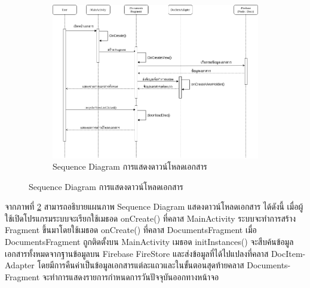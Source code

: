 	\begin{figure}
	\begin{figure}[H]
		\centering
		\includegraphics[width=0.8\columnwidth]
		{Figures/3/Sequence/doc}
		\caption{Sequence Diagram การแสดงดาวน์โหลดเอกสาร}
		\label{Fig:Sequence-doc}
	\end{figure}
	\end{figure}
	\newpage
	จากภาพที่ \ref{Fig:Sequence-doc} สามารถอธิบายแผนภาพ Sequence Diagram แสดงดาวน์โหลดเอกสาร ได้ดังนี้ เมื่อผู้ใช้เปิดโปรแกรมระบบจะเรียกใช้เมธอด onCreate() ที่คลาส MainActivity ระบบจะทำการสร้าง
	Fragment ขึ้นมาโดยใช้เมธอด onCreate() ที่คลาส DocumentsFragment เมื่อ DocumentsFragment ถูกติดตั้งบน MainActivity เมธอด initInstances() จะสืบค้นข้อมูลเอกสารทั้งหมดจากฐานข้อมูลบน Firebase FireStore และส่งข้อมูลที่ได้ไปแปลงที่คลาส DocItem-Adapter โดยมีการคืนค่าเป็นข้อมูลเอกสารแต่ละแถวและในขั้นตอนสุดท้ายคลาส Documents-Fragment จะทำการแสดงรายการกำหนดการวันปัจจุบันออกทางหน้าจอ

